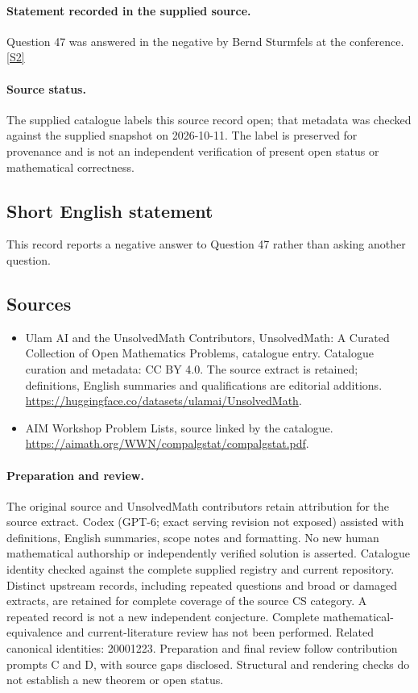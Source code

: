 \documentclass[11pt]{article}
\begin{document}
\paragraph{Statement recorded in the supplied source.}
Question 47 was answered in the negative by Bernd Sturmfels at the conference. \href{https://aimath.org/WWN/compalgstat/compalgstat.pdf}{[S2]}
\paragraph{Source status.}
The supplied catalogue labels this source record open; that metadata was checked against the supplied snapshot on 2026-10-11. The label is preserved for provenance and is not an independent verification of present open status or mathematical correctness.
\subsection{Short English statement}
This record reports a negative answer to Question 47 rather than asking another question.
\subsection{Sources}
\begin{itemize}
\item[S1] Ulam AI and the UnsolvedMath Contributors, UnsolvedMath: A Curated Collection of Open Mathematics Problems, catalogue entry. Catalogue curation and metadata: CC BY 4.0. The source extract is retained; definitions, English summaries and qualifications are editorial additions.
\url{https://huggingface.co/datasets/ulamai/UnsolvedMath}.
\item[S2] AIM Workshop Problem Lists, source linked by the catalogue.
\url{https://aimath.org/WWN/compalgstat/compalgstat.pdf}.
\end{itemize}
\paragraph{Preparation and review.}
The original source and UnsolvedMath contributors retain attribution for the source extract. Codex (GPT-6; exact serving revision not exposed) assisted with definitions, English summaries, scope notes and formatting. No new human mathematical authorship or independently verified solution is asserted. Catalogue identity checked against the complete supplied registry and current repository. Distinct upstream records, including repeated questions and broad or damaged extracts, are retained for complete coverage of the source CS category. A repeated record is not a new independent conjecture. Complete mathematical-equivalence and current-literature review has not been performed. Related canonical identities: 20001223. Preparation and final review follow contribution prompts C and D, with source gaps disclosed. Structural and rendering checks do not establish a new theorem or open status.
\label{end:statement}
\end{document}
